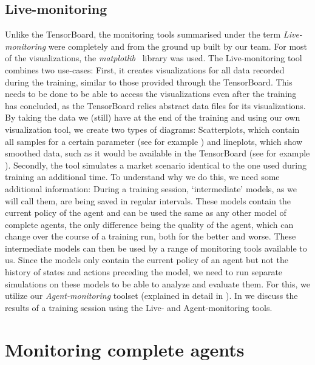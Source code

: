 \subsection*{Live-monitoring}\label{subsec:LiveMonitoring}

Unlike the TensorBoard, the monitoring tools summarised under the term \emph{Live-monitoring} were completely and from the ground up built by our team. For most of the visualizations, the \emph{matplotlib}~\cite{Matplotlib} library was used. The Live-monitoring tool combines two use-cases: First, it creates visualizations for all data recorded during the training, similar to those provided through the TensorBoard. This needs to be done to be able to access the visualizations even after the training has concluded, as the TensorBoard relies abstract data files for its visualizations. By taking the data we (still) have at the end of the training and using our own visualization tool, we create two types of diagrams: Scatterplots, which contain all samples for a certain parameter (see for example ) and lineplots, which show smoothed data, such as it would be available in the TensorBoard (see for example ). Secondly, the tool simulates a market scenario identical to the one used during training an additional time. To understand why we do this, we need some additional information: During a training session, `intermediate' models, as we will call them, are being saved in regular intervals. These models contain the current policy of the agent and can be used the same as any other model of complete agents, the only difference being the quality of the agent, which can change over the course of a training run, both for the better and worse. These intermediate models can then be used by a range of monitoring tools available to us. Since the models only contain the current policy of an agent but not the history of states and actions preceding the model, we need to run separate simulations on these models to be able to analyze and evaluate them. For this, we utilize our \emph{Agent-monitoring} toolset (explained in detail in ). In  we discuss the results of a training session using the Live- and Agent-monitoring tools.

\section{Monitoring complete agents}\label{sec:CompleteAgents}

